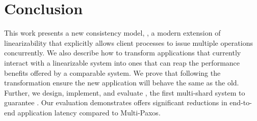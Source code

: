 \section{Conclusion}
\label{sec:concl}

This work presents a new consistency model, \mdllong{}, a
modern extension of linearizability that explicitly allows
client processes to issue multiple operations concurrently. We also describe how
to transform applications that currently interact with 
a linearizable system into ones that can reap the performance
benefits offered by a comparable \mdl{} system.
We prove that
following the transformation ensure the new application will 
behave the same as the old. Further, we design, implement,
and evaluate \sys{}, the first
multi-shard system to guarantee \mdl{}. Our evaluation 
demonstrates \sys{} offers significant 
reductions in end-to-end application latency compared to Multi-Paxos.
